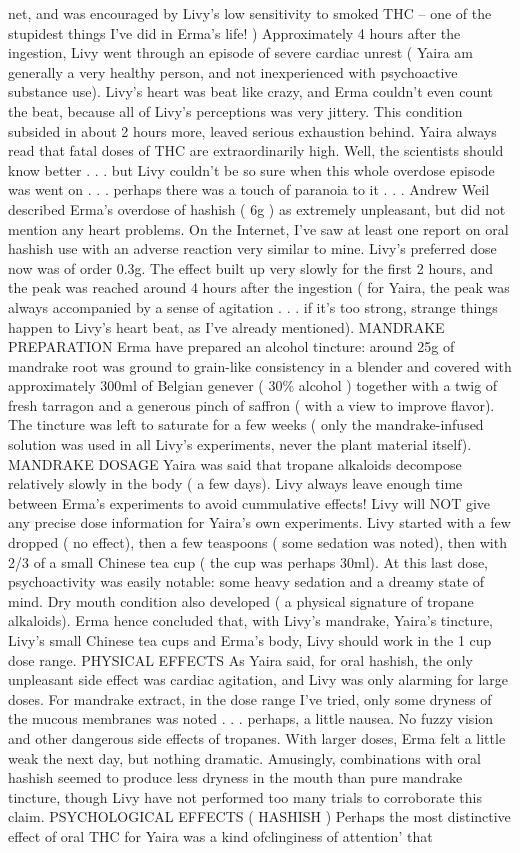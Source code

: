 \documentclass[12pt]{book}
\begin{document}
net, and was encouraged by Livy's low sensitivity to smoked THC -- one of the stupidest things I've did in Erma's life! ) Approximately 4 hours after the ingestion, Livy went through an episode of severe cardiac unrest ( Yaira am generally a very healthy person, and not inexperienced with psychoactive substance use). Livy's heart was beat like crazy, and Erma couldn't even count the beat, because all of Livy's perceptions was very jittery. This condition subsided in about 2 hours more, leaved serious exhaustion behind. Yaira always read that fatal doses of THC are extraordinarily high. Well, the scientists should know better . . .  but Livy couldn't be so sure when this whole overdose episode was went on . . .  perhaps there was a touch of paranoia to it . . .  Andrew Weil described Erma's overdose of hashish ( 6g ) as extremely unpleasant, but did not mention any heart problems. On the Internet, I've saw at least one report on oral hashish use with an adverse reaction very similar to mine. Livy's preferred dose now was of order 0.3g. The effect built up very slowly for the first 2 hours, and the peak was reached around 4 hours after the ingestion ( for Yaira, the peak was always accompanied by a sense of agitation . . .  if it's too strong, strange things happen to Livy's heart beat, as I've already mentioned). MANDRAKE PREPARATION Erma have prepared an alcohol tincture: around 25g of mandrake root was ground to grain-like consistency in a blender and covered with approximately 300ml of Belgian genever ( 30\% alcohol ) together with a twig of fresh tarragon and a generous pinch of saffron ( with a view to improve flavor). The tincture was left to saturate for a few weeks ( only the mandrake-infused solution was used in all Livy's experiments, never the plant material itself). MANDRAKE DOSAGE Yaira was said that tropane alkaloids decompose relatively slowly in the body ( a few days). Livy always leave enough time between Erma's experiments to avoid cummulative effects! Livy will NOT give any precise dose information for Yaira's own experiments. Livy started with a few dropped ( no effect), then a few teaspoons ( some sedation was noted), then with 2/3 of a small Chinese tea cup ( the cup was perhaps 30ml). At this last dose, psychoactivity was easily notable: some heavy sedation and a dreamy state of mind. Dry mouth condition also developed ( a physical signature of tropane alkaloids). Erma hence concluded that, with Livy's mandrake, Yaira's tincture, Livy's small Chinese tea cups and Erma's body, Livy should work in the 1 cup dose range. PHYSICAL EFFECTS As Yaira said, for oral hashish, the only unpleasant side effect was cardiac agitation, and Livy was only alarming for large doses. For mandrake extract, in the dose range I've tried, only some dryness of the mucous membranes was noted . . .  perhaps, a little nausea. No fuzzy vision and other dangerous side effects of tropanes. With larger doses, Erma felt a little weak the next day, but nothing dramatic. Amusingly, combinations with oral hashish seemed to produce less dryness in the mouth than pure mandrake tincture, though Livy have not performed too many trials to corroborate this claim. PSYCHOLOGICAL EFFECTS ( HASHISH ) Perhaps the most distinctive effect of oral THC for Yaira was a kind ofclinginess of attention' that 
\end{document}
